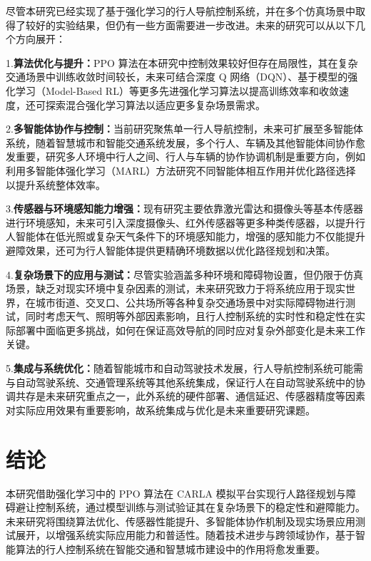 尽管本研究已经实现了基于强化学习的行人导航控制系统，并在多个仿真场景中取得了较好的实验结果，但仍有一些方面需要进一步改进。未来的研究可以从以下几个方向展开：

1.\textbf{算法优化与提升：}PPO 算法在本研究中控制效果较好但存在局限性，其在复杂交通场景中训练收敛时间较长，未来可结合深度 Q 网络（DQN）、基于模型的强化学习（Model-Based RL）等更多先进强化学习算法以提高训练效率和收敛速度，还可探索混合强化学习算法以适应更多复杂场景需求。

2.\textbf{多智能体协作与控制：}当前研究聚焦单一行人导航控制，未来可扩展至多智能体系统，随着智慧城市和智能交通系统发展，多个行人、车辆及其他智能体间协作愈发重要，研究多人环境中行人之间、行人与车辆的协作协调机制是重要方向，例如利用多智能体强化学习（MARL）方法研究不同智能体相互作用并优化路径选择以提升系统整体效率。

3.\textbf{传感器与环境感知能力增强：}现有研究主要依靠激光雷达和摄像头等基本传感器进行环境感知，未来可引入深度摄像头、红外传感器等更多种类传感器，以提升行人智能体在低光照或复杂天气条件下的环境感知能力，增强的感知能力不仅能提升避障效果，还可为行人智能体提供更精确环境数据以优化路径规划和决策。

4.\textbf{复杂场景下的应用与测试：}尽管实验涵盖多种环境和障碍物设置，但仍限于仿真场景，缺乏对现实环境中复杂因素的测试，未来研究致力于将系统应用于现实世界，在城市街道、交叉口、公共场所等各种复杂交通场景中对实际障碍物进行测试，同时考虑天气、照明等外部因素影响，且行人控制系统的实时性和稳定性在实际部署中面临更多挑战，如何在保证高效导航的同时应对复杂外部变化是未来工作关键。

5.\textbf{集成与系统优化：}随着智能城市和自动驾驶技术发展，行人导航控制系统可能需与自动驾驶系统、交通管理系统等其他系统集成，保证行人在自动驾驶系统中的协调共存是未来研究重点之一，此外系统的硬件部署、通信延迟、传感器精度等因素对实际应用效果有重要影响，故系统集成与优化是未来重要研究课题。

\section{结论}

本研究借助强化学习中的 PPO 算法在 CARLA 模拟平台实现行人路径规划与障碍避让控制系统，通过模型训练与测试验证其在复杂场景下的稳定性和避障能力。未来研究将围绕算法优化、传感器性能提升、多智能体协作机制及现实场景应用测试展开，以增强系统实际应用能力和普适性。随着技术进步与跨领域协作，基于智能算法的行人控制系统在智能交通和智慧城市建设中的作用将愈发重要。

